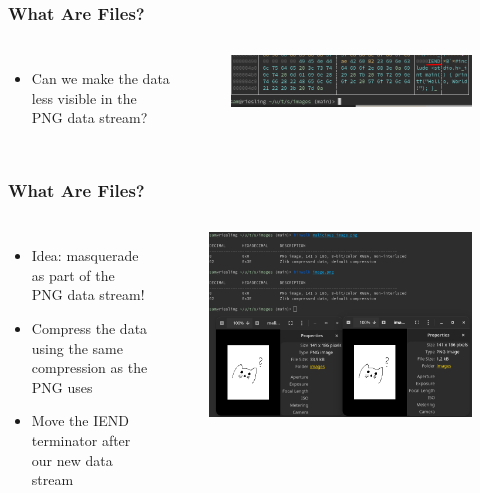 \documentclass[fleqn]{beamer}
\begin{document}
\begin{frame}
  \frametitle{What Are Files?}
  \begin{columns}[T]
    \column{\textwidth}
    \begin{itemize}
      \item Can we make the data less visible in the PNG data stream?
    \end{itemize}
    \begin{figure}[H]
      \centering
      \includegraphics[scale=0.5]{images/hex_dump_after_iend.png}
    \end{figure}
  \end{columns}
\end{frame}

\begin{frame}
  \frametitle{What Are Files?}
  \begin{columns}[T]
    \column{\textwidth}
    \begin{itemize}
      \item Idea: masquerade as part of the PNG data stream!
      \item Compress the data using the same compression as the PNG uses
      \item Move the IEND terminator after our new data stream
    \end{itemize}
    \begin{figure}[H]
      \centering
      \includegraphics[scale=0.33]{images/hidden_perfectly.png}
    \end{figure}
  \end{columns}
\end{frame}
\end{document}
